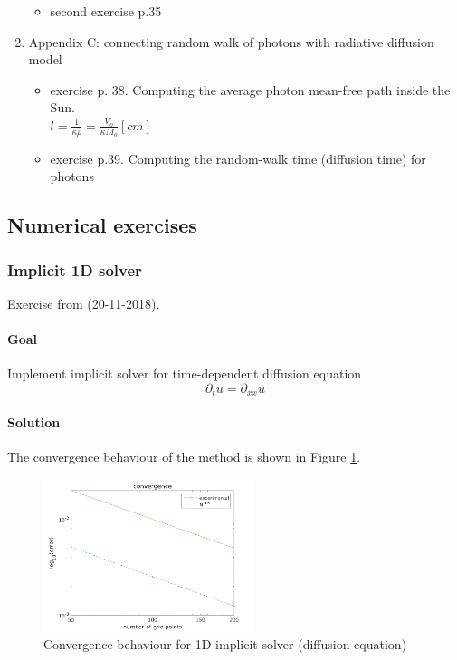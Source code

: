 \documentclass[../main/main.tex]{subfiles}
\begin{document}
\begin{enumerate}
\begin{itemize}
\begin{itemize}
\end{itemize}

\item second exercise p.35
\end{itemize}

\item Appendix C: connecting random walk of photons with radiative diffusion model
\begin{itemize}
\item exercise p. 38. Computing the average photon mean-free path inside the Sun. \\
$l = \frac{1}{\kappa \rho} = \frac{V_o}{\kappa M_o} [cm]$

\item exercise p.39. Computing the random-walk time (diffusion time) for photons

\end{itemize}
\end{enumerate}

\subsection{Numerical exercises}
\subsubsection{Implicit 1D solver}
Exercise from (20-11-2018).
\paragraph{Goal} Implement implicit solver for time-dependent diffusion equation
\begin{equation}
\partial_t u = \partial_{xx}u
\end{equation}
\paragraph{Solution}
The convergence behaviour of the method is shown in Figure \ref{1D_implicit_diffusion}.

\begin{figure}[!htp]
\centering
\includegraphics[width=0.55\textwidth]{../../introductory_exercises/diffusion_implicit_1D_solver/data/convergence.png}
\caption{Convergence behaviour for 1D implicit solver (diffusion equation)}
\label{1D_implicit_diffusion}
\end{figure}
\end{document}
